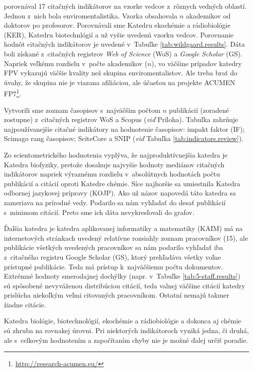 \citet{Wildgaard2015} porovnával 17 citačných indikátorov na vzorke vedcov
z~rôznych vedných oblastí. Jednou z~nich bola enviromentalistika. Vzorka
obsahovala $n$ akademikov od doktorov po profesorov. Porovnávali sme Katedru
ekochémie a rádiobiológie (KER), Katedru biotechnlógií a už vyšie uvedenú vzorku
vedcov.  Porovnanie hodnôt citačných indikátorov je uvedené v~Tabuľke
\ref{tab:wildgaard.results}.  Dáta boli získané z~citačných registrov \emph{Web
  of Science} (WoS) a \emph{Google Scholar} (GS).  Napriek veľkému rozdielu
v~počte akademikov ($n$), vo väčšine prípadov katedry FPV vykazujú väčšie
kvality než skupina enviromentalistov. Ale treba brať do úvahy, že skupina nie
je viazana afiliáciou, ale účasťou na projekte ACUMEN
FP7\footnote{\url{http://research-acumen.eu/}}.

Vytvorili sme zoznam časopisov s~najväčším počtom $n$ publikácií (zoradené
zostupne) z~citačných registrov WoS a Scopus (\emph{viď} Príloha).  Tabuľka
zahrňuje najpoužívanejšie citačné indikátory na hodnotenie časopisov: impakt
faktor (IF); Scimago rang časopisov; SciteCore a SNIP (\emph{viď} Tabuľka
\ref{tab:indicators.review}).

Zo scientometrického hodnotenia vyplýva, že najproduktívnejšia katedra je
Katedra biofyziky, pretože dosahuje najvyšie hodnoty mediánov citačných
indikátorov napriek výraznému rozdielu v~absolútnych hodnotách počtu publikácií
a citácií oproti Katedre chémie. Síce najhoršie sa umiestnila Katedra odbornej
jazykovej prípravy (KOJP). Ako už názov napovedá táto katedra sa zameriava na
prírodné vedy. Podarilo sa nám vyhľadať do desať publikácií s~minimom citácií.
Preto sme ich dáta nevykresľovali do grafov.

Ďalšia katedra je katedra aplikovanej informatiky a matematiky (KAIM) má na
internetových stránkach uvedený relatívne rozsiahly zoznam pracovníkov (15), ale
publikácie všetkých uvedených pracovníkov sa nám podarilo vyhľadať iba
z~citačného registru Google Scholar (GS), ktorý prehľadáva všetky voľne
prístupné publikácie. Teda má prístup k~najväčšiemu počtu dokumentov. Extrémné
hodnoty smerodajnej dochýlky (napr. v~Tabuľke \ref{tab:5-staff.results}) sú
spôsobené nevyváženou distribúciou citácií, teda valnej väčšine citácií katedry
prislúcha niekoľkým veľmi citovaných pracovníkom. Ostatní nemajú takmer žiadne
citácie.

Katedra biológie, biotechnológií, ekochémie a rádiobiológie a dokonca aj chémie
sú zhruba na rovnakej úrovni. Pri niektorých indikátoroch vyniká jedna, či
druhá, ale s~celkovým hodnotením a započítaním chyby nie je možné ďalej určiť
poradie.

